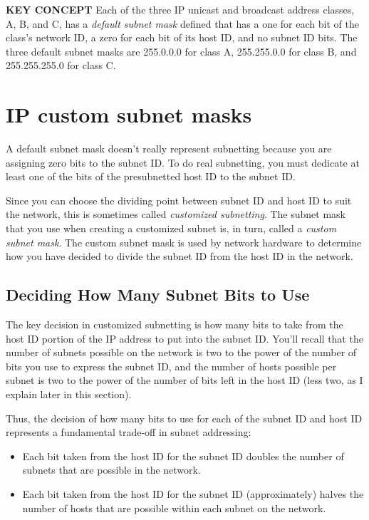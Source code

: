 {\textbf{KEY CONCEPT}} Each of the three IP unicast and broadcast
address classes, A, B, and C, has a {\emph{default subnet mask}} defined
that has a one for each bit of the class's network ID, a zero for each
bit of its host ID, and no subnet ID bits. The three default subnet
masks are 255.0.0.0 for class A, 255.255.0.0 for class B, and
255.255.255.0 for class C.



\section{IP custom subnet masks}

A default subnet mask doesn't really represent subnetting because you
are assigning zero bits to the subnet ID. To do real subnetting, you
must dedicate at least one of the bits of the presubnetted host ID to
the subnet ID.

Since you can choose the dividing point between subnet ID and host ID to
suit the network, this is sometimes called
{\emph{customized
subnetting}}. The subnet mask that you use when creating a customized
subnet is, in turn, called a {\emph{custom subnet mask}}. The custom
subnet mask is used by network hardware to determine how you have
decided to divide the subnet ID from the host ID in the network.



\subsection{Deciding How Many Subnet Bits to Use}

The key decision in customized subnetting is how many bits to take from
the host ID portion of the
IP address
to put into the subnet ID. You'll recall that the number of subnets
possible on the network is two to the power of the number of bits you
use to express the subnet ID, and the number of hosts possible per
subnet is two to the power of the number of bits left in the host ID
(less two, as I explain later in this section).

Thus, the decision of how many bits to use for each of the subnet ID and
host ID represents a fundamental trade-off in subnet addressing:

\begin{itemize}
\item
  Each bit taken from the host ID for the subnet ID doubles the number
  of subnets that are possible in the network.
\item
  Each bit taken from the host ID for the subnet ID (approximately)
  halves the number of hosts that are possible within each subnet on the
  network.
\end{itemize}

